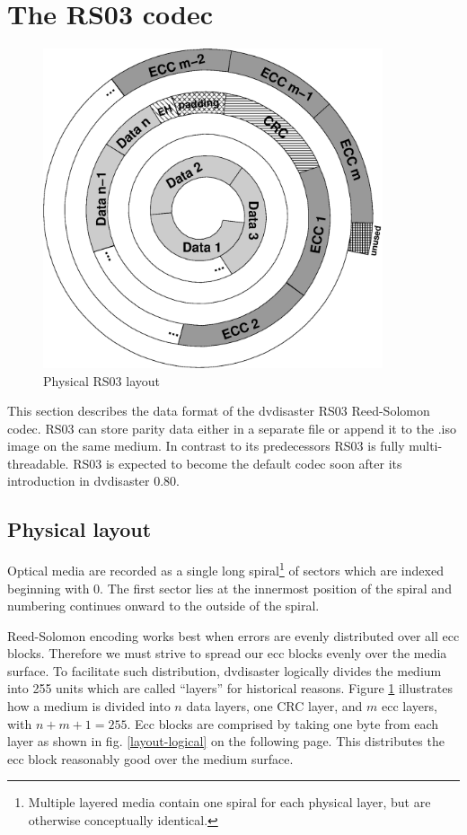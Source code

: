 \section{The RS03 codec}

\begin{figure}
 \begin{center}
 \includegraphics[width=10cm]{spiral-rs03.eps}
 \caption{Physical RS03 layout}
 \label{layout-phy}
 \end{center}
\end{figure}

This section describes the data format of the dvdisaster RS03 Reed-Solomon codec.
RS03 can store parity data either in a separate file or append it to the .iso
image on the same medium. In contrast to its predecessors RS03 is fully multi-threadable.
RS03  is expected to become the default codec soon after its introduction in 
dvdisaster 0.80.

\subsection{Physical layout}

Optical media are recorded as a single long spiral\footnote{Multiple layered
media contain one spiral for each physical layer, but are otherwise conceptually
identical.} of sectors which are indexed beginning with 0. 
The first sector lies at the innermost position of the spiral and 
numbering continues onward to the outside of the spiral.

Reed-Solomon encoding works best when errors are evenly distributed over
all ecc blocks. Therefore we must strive to spread our ecc blocks evenly over
the media surface. To facilitate such distribution, dvdisaster logically
divides the medium into 255 units which are called ``layers'' for historical reasons.
Figure \ref{layout-phy} illustrates how a medium is divided into $n$ data layers,
one CRC layer, and $m$ ecc layers, with $n+m+1 = 255$. Ecc blocks are comprised
by taking one byte from each layer as shown in fig. \ref{layout-logical} on 
the following page.
This distributes the ecc block reasonably good 
over the medium surface.

